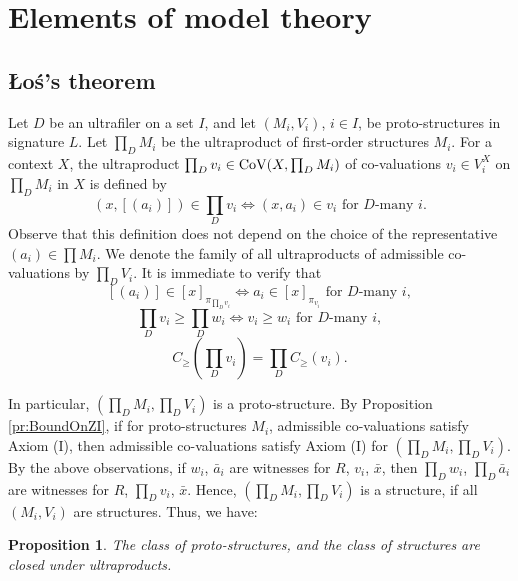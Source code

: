 \documentclass[12pt]{amsart}
\theoremstyle{plain}
\newtheorem{proposition}[theorem]{\bf Proposition}
\newcommand \Val{{\rm{CoV}}}
\begin{document}
\section{Elements of model theory}
	
	\subsection{\L{}o\'s's theorem} Let $D $ be an ultrafiler on a set $I$, and let $(M_i,V_i)$, $i \in I$, be proto-structures in signature $L$. Let $\prod_D M_i$ be the ultraproduct of first-order structures $M_i$. For a context $X$, the ultraproduct $\prod_D v_i \in \Val(X, \prod_D M_i)$ of co-valuations $v_i \in V_i^X$ on $\prod_D M_i$ in $X$ is defined by
	\[
	(x, [(a_i)]) \in \prod_D v_i \iff (x, a_i) \in v_i \text{ for $D$-many $i$}.
	\]
	 Observe that this definition does not depend on the choice of the representative $(a_i) \in \prod M_i$. We denote the family of all ultraproducts of admissible co-valuations by $\prod_D V_i$. It is immediate to verify that
	$$ [(a_i)] \in [x]_{\pi_{\prod_D v_i}} \iff  a_i \in [x]_{\pi_{v_i}} \text{ for $D$-many  $i$},$$ 
	$$ \prod_D v_i \geq \prod_D w_i \iff v_i \geq w_i \text{ for $D$-many  $i$}, $$
	$$ C_\geq(\prod_D v_i) = \prod_D C_\geq(v_i).$$
	
	In particular, $(\prod_D M_i, \prod_D V_i)$ is a proto-structure. By Proposition \ref{pr:BoundOnZI}, if for proto-structures $M_i$, admissible co-valuations satisfy Axiom (I), then admissible co-valuations satisfy Axiom (I) for $(\prod_D M_i, \prod_D V_i)$. By the above observations, if $w_i$, $\bar{a}_i$ are witnesses for $R$, $v_i$, $\bar{x}$, then $\prod_D w_i$, $\prod_D \bar{a}_i$  are witnesses for $R$, $\prod_D v_i$, $\bar{x}$.  Hence,  $(\prod_D M_i, \prod_D V_i)$ is a structure, if all $(M_i,V_i)$ are structures. Thus, we have:
	
\begin{proposition}
The class of proto-structures, and the class of structures are closed under ultraproducts.
\end{proposition}
	
\end{document}
